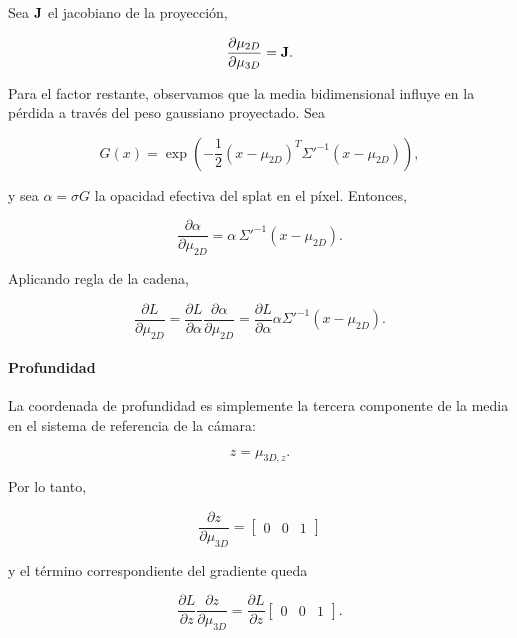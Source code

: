 Sea $\mathbf{J}$ el jacobiano de la proyección,

\begin{equation}
    \frac{\partial \mu_{2D}}{\partial \mu_{3D}} = \mathbf{J}.
\end{equation}

Para el factor restante, observamos que la media bidimensional influye en la
pérdida a través del peso gaussiano proyectado. Sea

\begin{equation}
G(x) =
\exp\!\left(
-\frac{1}{2} (x-\mu_{2D})^T \Sigma'^{-1} (x-\mu_{2D})
\right),
\end{equation}

\noindent y sea $\alpha = \sigma G$ la opacidad efectiva del splat en el píxel.
Entonces,

\begin{equation}
\frac{\partial \alpha}{\partial \mu_{2D}}
=
\alpha \, \Sigma'^{-1}(x-\mu_{2D}).
\end{equation}

Aplicando regla de la cadena,

\begin{equation}
\frac{\partial L}{\partial \mu_{2D}}
=
\frac{\partial L}{\partial \alpha}
\frac{\partial \alpha}{\partial \mu_{2D}}
=
\frac{\partial L}{\partial \alpha}
\alpha
\Sigma'^{-1}(x-\mu_{2D}).
\end{equation}

\paragraph{Profundidad}

La coordenada de profundidad es simplemente la tercera componente de la media en el sistema de referencia de la cámara:

\begin{equation}
    z = \mu_{3D,z}.
\end{equation}

Por lo tanto,

\begin{equation}
    \frac{\partial z}{\partial \mu_{3D}} =
    \begin{bmatrix}
        0 & 0 & 1
    \end{bmatrix}
\end{equation}

\noindent y el término correspondiente del gradiente queda

\begin{equation}
    \frac{\partial L}{\partial z}
    \frac{\partial z}{\partial \mu_{3D}}
    =
    \frac{\partial L}{\partial z}
    \begin{bmatrix}
        0 & 0 & 1
    \end{bmatrix}.
\end{equation}

